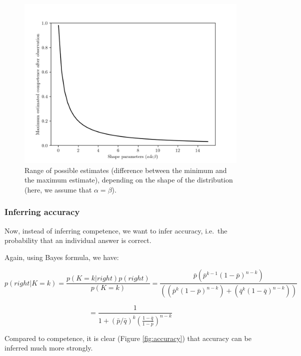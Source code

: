 \documentclass[
  doc,floatsintext]{apa6}
\begin{document}
\begin{figure}

\includegraphics[width=0.75\linewidth]{figures/Benoit_update} \hfill{}

\caption{Range of possible estimates (difference between the minimum and the maximum estimate), depending on the shape of the distribution (here, we assume that \(\alpha=\beta\)).}\label{fig:update}
\end{figure}

\subsubsection{Inferring accuracy}\label{inferring-accuracy}

Now, instead of inferring competence, we want to infer accuracy, i.e.~the probability that an individual answer is correct.

Again, using Bayes formula, we have:

\[
p(right|K=k) = \frac{p(K=k|right)p(right)}{p(K=k)} = \frac{\bar p (\bar p^{k-1} (1-\bar p)^{n-k})}{((\bar p^k (1-\bar p)^{n-k}) + (\bar q^k (1-\bar q)^{n-k}))} 
\]

\[
= \frac{1}{1 +  (\bar p/\bar q)^k \left( \frac{1-\bar q}{1-\bar p}\right)^{n-k} }
\]

Compared to competence, it is clear (Figure \ref{fig:accuracy}) that accuracy can be inferred much more strongly.
\end{document}
